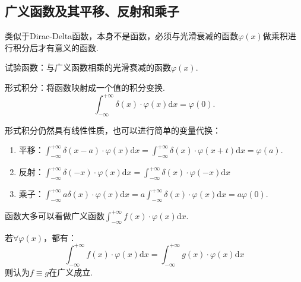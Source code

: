 \documentclass[openany,oneside]{ctexbook}
\begin{document}
\subsection{广义函数及其平移、反射和乘子}
% 
类似于Dirac-Delta函数，本身不是函数，必须与光滑衰减的函数$\varphi(x)$做乘积进行积分后才有意义的函数.
\par 试验函数：与广义函数相乘的光滑衰减的函数$\varphi(x)$.
\par 形式积分：将函数映射成一个值的积分变换.
\[\int_{-\infty}^{+\infty}\delta(x)\cdot\varphi(x)\mathrm{d}x=\varphi(0).\]
\par 形式积分仍然具有线性性质，也可以进行简单的变量代换：
\begin{enumerate}[label=(\arabic*), itemsep=1pt]
    \item 平移：$\displaystyle\int_{-\infty}^{+\infty}\delta(x-a)\cdot\varphi(x)\mathrm{d}x=\int_{-\infty}^{+\infty}\delta(x)\cdot\varphi(x+t)\mathrm{d}x=\varphi(a)$.
    \item 反射：$\displaystyle\int_{-\infty}^{+\infty}\delta(-x)\cdot\varphi(x)\mathrm{d}x=\int_{-\infty}^{+\infty}\delta(x)\cdot\varphi(-x)\mathrm{d}x$
    \item 乘子：$\displaystyle\int_{-\infty}^{+\infty}a\delta(x)\cdot\varphi(x)\mathrm{d}x=a\int_{-\infty}^{+\infty}\delta(x)\cdot\varphi(x)\mathrm{d}x=a\varphi(0)$.
\end{enumerate}

    \par 函数大多可以看做广义函数$\displaystyle\int_{-\infty}^{+\infty}f(x)\cdot\varphi(x)\mathrm{d}x$.
    \begin{note*}
        若$\forall\varphi(x)$，都有：
        \[\int_{-\infty}^{+\infty}f(x)\cdot\varphi(x)\mathrm{d}x=\int_{-\infty}^{+\infty}g(x)\cdot\varphi(x)\mathrm{d}x\]
        则认为$f\equiv g$在广义成立.
    \end{note*}
\end{document}
